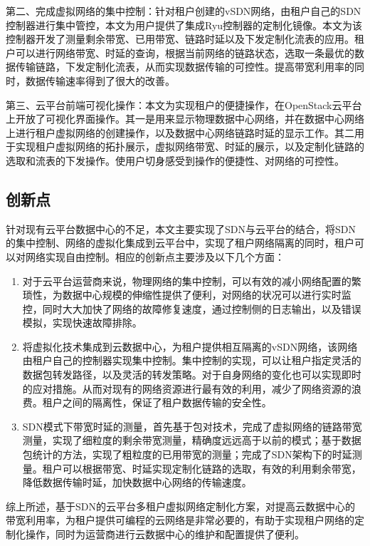 第二、完成虚拟网络的集中控制：针对租户创建的vSDN网络，由租户自己的SDN控制器进行集中管控，本文为用户提供了集成Ryu\cite{Ryu-1}控制器的定制化镜像。本文为该控制器开发了测量剩余带宽、已用带宽、链路时延以及下发定制化流表的应用。租户可以进行网络带宽、时延的查询，根据当前网络的链路状态，选取一条最优的数据传输链路，下发定制化流表，从而实现数据传输的可控性。提高带宽利用率的同时，数据传输速率得到了很大的改善。

第三、云平台前端可视化操作：本文为实现租户的便捷操作，在OpenStack云平台上开放了可视化界面操作。其一是用来显示物理数据中心网络，并在数据中心网络上进行租户虚拟网络的创建操作，以及数据中心网络链路时延的显示工作。其二用于实现租户虚拟网络的拓扑展示，虚拟网络带宽、时延的展示，以及定制化链路的选取和流表的下发操作。使用户切身感受到操作的便捷性、对网络的可控性。

\subsection{创新点}
针对现有云平台数据中心的不足，本文主要实现了SDN与云平台的结合，将SDN的集中控制、网络的虚拟化集成到云平台中，实现了租户网络隔离的同时，租户可以对网络实现自由控制。相应的创新点主要涉及以下几个方面：

\begin{enumerate}
\item 对于云平台运营商来说，物理网络的集中控制，可以有效的减小网络配置的繁琐性，为数据中心规模的伸缩性提供了便利，对网络的状况可以进行实时监控，同时大大加快了网络的故障修复速度，通过控制侧的日志输出，以及错误模拟，实现快速故障排除。
\item 将虚拟化技术集成到云数据中心，为租户提供相互隔离的vSDN网络，该网络由租户自己的控制器实现集中控制。集中控制的实现，可以让租户指定灵活的数据包转发路径，以及灵活的转发策略。对于自身网络的变化也可以实现即时的应对措施。从而对现有的网络资源进行最有效的利用，减少了网络资源的浪费。租户之间的隔离性，保证了租户数据传输的安全性。
\item SDN模式下带宽时延的测量，首先基于包对技术，完成了虚拟网络的链路带宽测量，实现了细粒度的剩余带宽测量，精确度远远高于以前的模式；基于数据包统计的方法，实现了粗粒度的已用带宽的测量；完成了SDN架构下的时延测量。租户可以根据带宽、时延实现定制化链路的选取，有效的利用剩余带宽，降低数据传输时延，加快数据中心网络的传输速度。
\end{enumerate}

综上所述，基于SDN的云平台多租户虚拟网络定制化方案，对提高云数据中心的带宽利用率，为租户提供可编程的云网络是非常必要的，有助于实现租户网络的定制化操作，同时为运营商进行云数据中心的维护和配置提供了便利。

